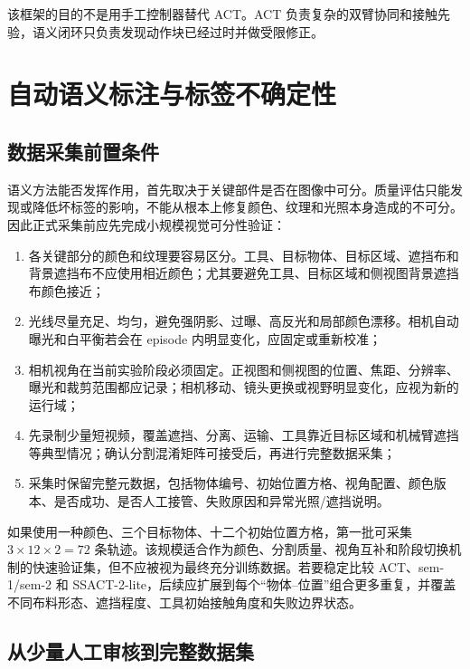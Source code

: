 \documentclass[UTF8,a4paper,11pt]{ctexart}
\begin{document}
该框架的目的不是用手工控制器替代 ACT。ACT 负责复杂的双臂协同和接触先验，语义闭环只负责发现动作块已经过时并做受限修正。

\section{自动语义标注与标签不确定性}

\subsection{数据采集前置条件}

语义方法能否发挥作用，首先取决于关键部件是否在图像中可分。质量评估只能发现或降低坏标签的影响，不能从根本上修复颜色、纹理和光照本身造成的不可分。因此正式采集前应先完成小规模视觉可分性验证：
\begin{enumerate}[leftmargin=2.3em]
  \item 各关键部分的颜色和纹理要容易区分。工具、目标物体、目标区域、遮挡布和背景遮挡布不应使用相近颜色；尤其要避免工具、目标区域和侧视图背景遮挡布颜色接近；
  \item 光线尽量充足、均匀，避免强阴影、过曝、高反光和局部颜色漂移。相机自动曝光和白平衡若会在 episode 内明显变化，应固定或重新校准；
  \item 相机视角在当前实验阶段必须固定。正视图和侧视图的位置、焦距、分辨率、曝光和裁剪范围都应记录；相机移动、镜头更换或视野明显变化，应视为新的运行域；
  \item 先录制少量短视频，覆盖遮挡、分离、运输、工具靠近目标区域和机械臂遮挡等典型情况；确认分割混淆矩阵可接受后，再进行完整数据采集；
  \item 采集时保留完整元数据，包括物体编号、初始位置方格、视角配置、颜色版本、是否成功、是否人工接管、失败原因和异常光照/遮挡说明。
\end{enumerate}

如果使用一种颜色、三个目标物体、十二个初始位置方格，第一批可采集 $3\times12\times2=72$ 条轨迹。该规模适合作为颜色、分割质量、视角互补和阶段切换机制的快速验证集，但不应被视为最终充分训练数据。若要稳定比较 ACT、sem-1/sem-2 和 SSACT-2-lite，后续应扩展到每个“物体--位置”组合更多重复，并覆盖不同布料形态、遮挡程度、工具初始接触角度和失败边界状态。

\subsection{从少量人工审核到完整数据集}
\end{document}
